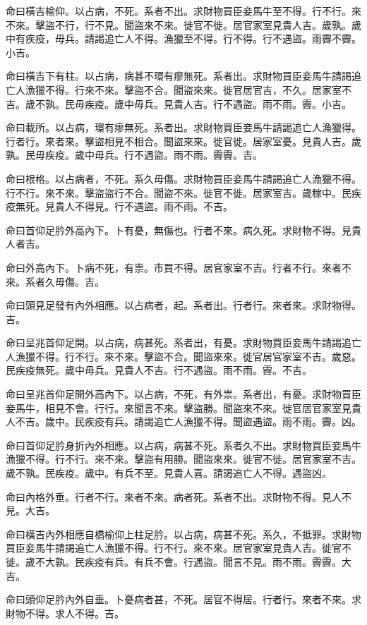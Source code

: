 \begin{pinyinscope}
命曰橫吉榆仰。以占病，不死。系者不出。求財物買臣妾馬牛至不得。行不行。來不來。擊盜不行，行不見。聞盜來不來。徙官不徙。居官家室見貴人吉。歲孰。歲中有疾疫，毋兵。請謁追亡人不得。漁獵至不得。行不得。行不遇盜。雨霽不霽。小吉。

命曰橫吉下有柱。以占病，病甚不環有瘳無死。系者出。求財物買臣妾馬牛請謁追亡人漁獵不得。行來不來。擊盜不合。聞盜來來。徙官居官吉，不久。居家室不吉。歲不孰。民毋疾疫。歲中毋兵。見貴人吉。行不遇盜。雨不雨。霽。小吉。

命曰載所。以占病，環有瘳無死。系者出。求財物買臣妾馬牛請謁追亡人漁獵得。行者行。來者來。擊盜相見不相合。聞盜來來。徙官徙。居家室憂。見貴人吉。歲孰。民毋疾疫。歲中毋兵。行不遇盜。雨不雨。霽霽。吉。

命曰根格。以占病者，不死。系久毋傷。求財物買臣妾馬牛請謁追亡人漁獵不得。行不行。來不來。擊盜盜行不合。聞盜不來。徙官不徙。居家室吉。歲稼中。民疾疫無死。見貴人不得見。行不遇盜。雨不雨。不吉。

命曰首仰足肣外高內下。卜有憂，無傷也。行者不來。病久死。求財物不得。見貴人者吉。

命曰外高內下。卜病不死，有祟。市買不得。居官家室不吉。行者不行。來者不來。系者久毋傷。吉。

命曰頭見足發有內外相應。以占病者，起。系者出。行者行。來者來。求財物得。吉。

命曰呈兆首仰足開。以占病，病甚死。系者出，有憂。求財物買臣妾馬牛請謁追亡人漁獵不得。行不行。來不來。擊盜不合。聞盜來來。徙官居官家室不吉。歲惡。民疾疫無死。歲中毋兵。見貴人不吉。行不遇盜。雨不雨。霽。不吉。

命曰呈兆首仰足開外高內下。以占病，不死，有外祟。系者出，有憂。求財物買臣妾馬牛，相見不會。行行。來聞言不來。擊盜勝。聞盜來不來。徙官居官家室見貴人不吉。歲中。民疾疫有兵。請謁追亡人漁獵不得。聞盜遇盜。雨不雨。霽。凶。

命曰首仰足肣身折內外相應。以占病，病甚不死。系者久不出。求財物買臣妾馬牛漁獵不得。行不行。來不來。擊盜有用勝。聞盜來來。徙官不徙。居官家室不吉。歲不孰。民疾疫。歲中。有兵不至。見貴人喜。請謁追亡人不得。遇盜凶。

命曰內格外垂。行者不行。來者不來。病者死。系者不出。求財物不得。見人不見。大吉。

命曰橫吉內外相應自橋榆仰上柱足肣。以占病，病甚不死。系久，不抵罪。求財物買臣妾馬牛請謁追亡人漁獵不得。行不行。來不來。居官家室見貴人吉。徙官不徙。歲不大孰。民疾疫有兵。有兵不會。行遇盜。聞言不見。雨不雨。霽霽。大吉。

命曰頭仰足肣內外自垂。卜憂病者甚，不死。居官不得居。行者行。來者不來。求財物不得。求人不得。吉。


\end{pinyinscope}
